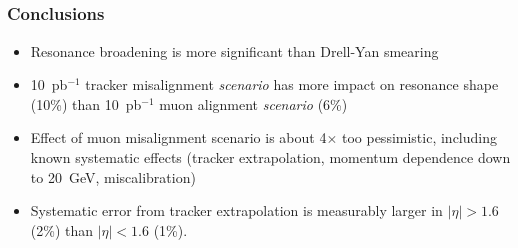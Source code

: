 \documentclass[compress]{beamer}
\begin{document}
\section*{\mbox{ }}

\begin{frame}
\frametitle{Conclusions}
\begin{itemize}\setlength{\itemsep}{0.35 cm}
\item Resonance broadening is more significant than Drell-Yan smearing
\item 10~pb$^{-1}$ tracker misalignment {\it scenario} has more
impact on resonance shape (10\%) than 10~pb$^{-1}$ muon alignment {\it scenario} (6\%)
\item Effect of muon misalignment scenario is about 4$\times$ too
pessimistic, including known systematic effects (tracker
extrapolation, momentum dependence down to 20~GeV, miscalibration)
\item Systematic error from tracker extrapolation is measurably larger
in $|\eta| > 1.6$ (2\%) than $|\eta| < 1.6$ (1\%).
\end{itemize}
\label{numpages}
\end{frame}
\end{document}

